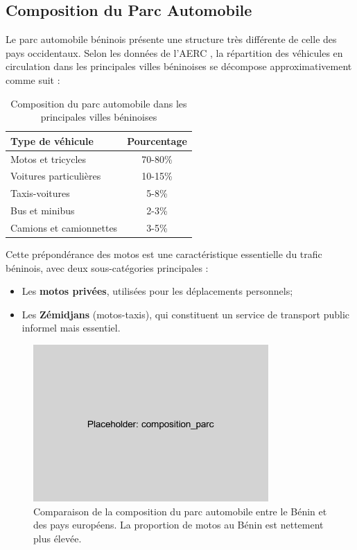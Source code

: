 \subsection{Composition du Parc Automobile}
\label{subsec:composition_parc}

Le parc automobile béninois présente une structure très différente de celle des pays occidentaux. Selon les données de l'AERC \cite{aerc2019taxi}, la répartition des véhicules en circulation dans les principales villes béninoises se décompose approximativement comme suit :

\begin{table}[htbp]
\centering
\caption{Composition du parc automobile dans les principales villes béninoises}
\label{tab:composition_parc}
\begin{tabular}{lc}
\toprule
\textbf{Type de véhicule} & \textbf{Pourcentage} \\
\midrule
Motos et tricycles & 70-80\% \\
Voitures particulières & 10-15\% \\
Taxis-voitures & 5-8\% \\
Bus et minibus & 2-3\% \\
Camions et camionnettes & 3-5\% \\
\bottomrule
\end{tabular}
\end{table}

Cette prépondérance des motos est une caractéristique essentielle du trafic béninois, avec deux sous-catégories principales :
\begin{itemize}
\item Les \textbf{motos privées}, utilisées pour les déplacements personnels;
\item Les \textbf{Zémidjans} (motos-taxis), qui constituent un service de transport public informel mais essentiel.
\end{itemize}

\begin{figure}[htbp]
\centering
\includegraphics[width=0.8\textwidth]{images/specificites_benin/composition_parc}
\caption{Comparaison de la composition du parc automobile entre le Bénin et des pays européens. La proportion de motos au Bénin est nettement plus élevée.}
\label{fig:composition_parc}
\end{figure}


